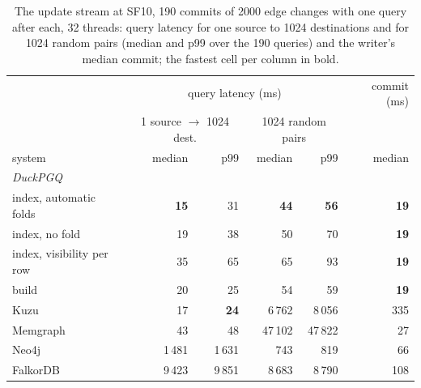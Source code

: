 \begin{table}[t]\centering\scriptsize\setlength{\tabcolsep}{3pt}
\caption{The update stream at SF10, 190 commits of 2000 edge changes with one query after each, 32 threads: query latency for one source to 1024 destinations and for 1024 random pairs (median and p99 over the 190 queries) and the writer's median commit; the fastest cell per column in bold.}\label{tab:updates}
\begin{tabular}{lrrrrr}\toprule
 & \multicolumn{4}{c}{query latency (ms)} & commit (ms) \\
 & \multicolumn{2}{c}{1 source $\to$ 1024 dest.} & \multicolumn{2}{c}{1024 random pairs} & \\
system & median & p99 & median & p99 & median \\ \midrule
\multicolumn{6}{l}{\textit{DuckPGQ}} \\
\quad index, automatic folds & \textbf{15} & 31 & \textbf{44} & \textbf{56} & \textbf{19} \\
\quad index, no fold & 19 & 38 & 50 & 70 & \textbf{19} \\
\quad index, visibility per row & 35 & 65 & 65 & 93 & \textbf{19} \\
\quad build & 20 & 25 & 54 & 59 & \textbf{19} \\
\addlinespace
Kuzu & 17 & \textbf{24} & 6\,762 & 8\,056 & 335 \\
Memgraph & 43 & 48 & 47\,102 & 47\,822 & 27 \\
Neo4j & 1\,481 & 1\,631 & 743 & 819 & 66 \\
FalkorDB & 9\,423 & 9\,851 & 8\,683 & 8\,790 & 108 \\
\bottomrule\end{tabular}\end{table}
